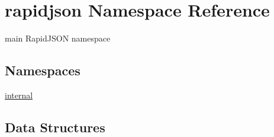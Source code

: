 \hypertarget{namespacerapidjson}{}\section{rapidjson Namespace Reference}
\label{namespacerapidjson}


main Rapid\+J\+S\+ON namespace  


\subsection*{Namespaces}
\begin{DoxyCompactItemize}
\item 
 \mbox{\hyperlink{namespacerapidjson_1_1internal}{internal}}
\end{DoxyCompactItemize}
\subsection*{Data Structures}

